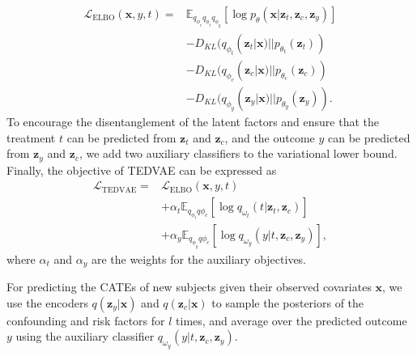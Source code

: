 \documentclass[letterpaper]{article} %
\begin{document}
\begin{align}
\mathcal{L}_{\textrm{ELBO}}(\mathbf{x},y,t) = & \mathbb{E}_{q_{\phi_c}{q_{\phi_t}}{q_{\phi_y}}} [\log p_\theta (\mathbf{x}|\mathbf{z}_t, \mathbf{z}_c, \mathbf{z}_y)] \nonumber\\
& -  D_{KL} (q_{\phi_t}(\mathbf{z}_t|\mathbf{x})|| p_{\theta_t}(\mathbf{z}_t)) \nonumber\\
& -  D_{KL} (q_{\phi_c}(\mathbf{z}_c|\mathbf{x})|| p_{\theta_c}(\mathbf{z}_c)) \nonumber\\
& -  D_{KL} (q_{\phi_y}(\mathbf{z}_y|\mathbf{x})|| p_{\theta_y}(\mathbf{z}_y)).
\end{align}
To  encourage the disentanglement of the latent factors and ensure that the treatment $t$ can be predicted from $\mathbf{z}_t$ and $\mathbf{z}_c$, and the outcome $y$ can be predicted from $\mathbf{z}_y$ and $\mathbf{z}_c$,  we add two auxiliary classifiers to the variational lower bound. Finally, the objective of TEDVAE can be expressed as
\begin{align}
\mathcal{L}_{\text{TEDVAE}} = & \mathcal{L}_{\textrm{ELBO}}(\mathbf{x},y,t)\nonumber\\
& + \alpha_t \mathbb{E}_{q_{\phi_{t}} q\phi_{c}} [\log q_{\omega_t}(t|\mathbf{z}_t,\mathbf{z}_c)]\nonumber \\
&+  \alpha_y \mathbb{E}_{q_{\phi_{y}} q\phi_{c}} [\log q_{\omega_y}(y|t, \mathbf{z}_c, \mathbf{z}_y)],
\label{loss_function}
\end{align}
where $\alpha_t$ and $\alpha_y$ are the weights for the auxiliary objectives.

For predicting the CATEs of new subjects given their observed covariates $\mathbf{x}$, we use the encoders $q(\mathbf{z}_y|\mathbf{x})$ and $q(\mathbf{z}_c|\mathbf{x})$ to sample the posteriors of the confounding and risk factors for $l$ times, and average over the predicted outcome $y$ using the auxiliary classifier $q_{\omega_y}(y|t, \mathbf{z}_c, \mathbf{z}_y)$. 
\end{document}
